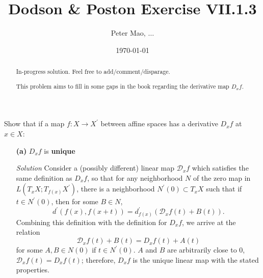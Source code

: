 \documentclass[11pt]{article}
\title{Dodson \& Poston Exercise VII.1.3}
\author{Peter Mao, $\ldots$}
\date{\today}
\begin{document}
\maketitle
\pagestyle{empty}

\begin{abstract}
  In-progress solution.  Feel free to add/comment/disparage.

  This problem aims to fill in some gaps in the book regarding the derivative map $D_xf$.
\end{abstract}

Show that if a map $f\colon X \to X^\prime$ between affine spaces has a derivative $D_xf$ at $x \in
X$:

\begin{itemize}
\item[\textbf{(a)}] $D_xf$ is \textbf{unique}
\item[\emph{Solution}] Consider a (possibly different) linear map $\mathcal{D}_xf$ which satisfies
  the same definition as $D_xf$, so that for any neighborhood $N$ of the zero map in $L(T_xX;
  T_{f(x)}X^\prime)$, there is a neighborhood $N^\prime(0) \subset T_xX$ such that if $t \in
  N^\prime(0)$, then for some $B \in N$,
  \begin{equation}
    d^\prime(f(x),f(x+t)) = d^\prime_{f(x)}(\mathcal{D}_xf(t) + B(t)).
    \label{Eqn1}
  \end{equation}
  Combining this definition with the definition for $D_xf$, we arrive at the relation
  \begin{equation}
    \mathcal{D}_xf(t) + B(t) = D_xf(t) + A(t)
  \end{equation}
  for some $A,B \in N(0)$ if $t \in N^\prime(0)$.  $A$ and $B$ are arbitrarily close to 0,
  $\mathcal{D}_xf(t) =D_xf(t)$; therefore, $D_xf$ is the unique linear map with the stated
  properties.


\end{itemize}
\end{document}

